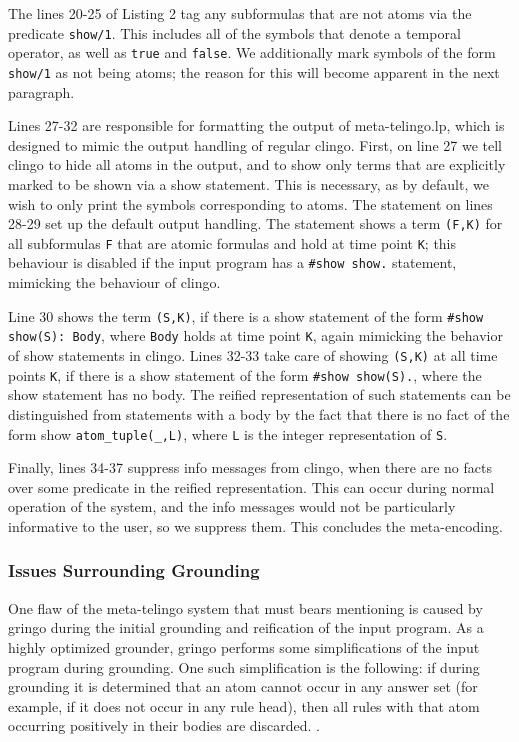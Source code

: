 The lines 20-25 of Listing 2 tag any subformulas that are not atoms
via the predicate \verb|show/1|. This includes all of the symbols that
denote a temporal operator, as well as \verb|true| and
\verb|false|. We additionally mark symbols of the form \verb|show/1|
as not being atoms; the reason for this will become apparent in the
next paragraph.

Lines 27-32 are responsible for formatting the output of
meta-telingo.lp, which is designed to mimic the output handling of
regular clingo. First, on line 27 we tell clingo to hide all atoms in
the output, and to show only terms that are explicitly marked to be
shown via a show statement. This is necessary, as by default, we wish
to only print the symbols corresponding to atoms. The statement on
lines 28-29 set up the default output handling. The statement shows a
term \verb|(F,K)| for all subformulas \verb|F| that are atomic
formulas and hold at time point \verb|K|; this behaviour is disabled
if the input program has a \verb|#show show.| statement, mimicking the
behaviour of clingo.

Line 30 shows the term \verb|(S,K)|, if there is a show statement of
the form \verb|#show show(S): Body|, where \verb|Body| holds at time
point \verb|K|, again mimicking the behavior of show statements in
clingo. Lines 32-33 take care of showing \verb|(S,K)| at all time
points \verb|K|, if there is a show statement of the form
\verb|#show show(S).|, where the show statement has no body. The
reified representation of such statements can be distinguished from
statements with a body by the fact that there is no fact of the form
show \verb|atom_tuple(_,L)|, where \verb|L| is the integer
representation of \verb|S|.

Finally, lines 34-37 suppress info messages from clingo, when there
are no facts over some predicate in the reified representation. This
can occur during normal operation of the system, and the info messages
would not be particularly informative to the user, so we suppress
them. This concludes the meta-encoding.

\subsubsection{Issues Surrounding Grounding}

One flaw of the meta-telingo system that must bears mentioning is
caused by gringo during the initial grounding and reification of the
input program. As a highly optimized grounder, gringo performs some
simplifications of the input program during grounding. One such
simplification is the following: if during grounding it is determined
that an atom cannot occur in any answer set (for example, if it does
not occur in any rule head), then all rules with that atom occurring
positively in their bodies are discarded. \cite{gekakasc12a}.

